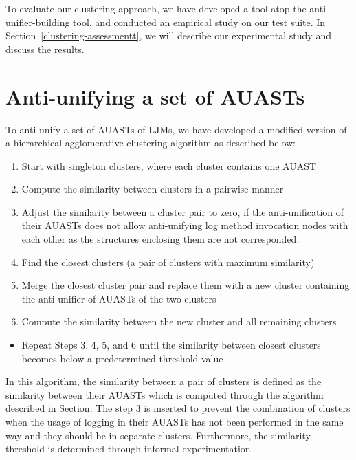 To evaluate our clustering approach, we have developed a tool atop the anti-unifier-building tool, and conducted an empirical study on our test suite. In Section~\ref{clustering-assessmentt}, we will describe our experimental study and discuss the results. 



\section{Anti-unifying a set of AUASTs} \label{meth-clustering}
To anti-unify a set of AUASTs of LJMs, we have developed a modified version of a hierarchical agglomerative clustering algorithm as described below:
\begin{enumerate} [leftmargin=.3in]
\item Start with singleton clusters, where each cluster contains one AUAST
\item Compute the similarity between clusters in a pairwise manner
\item Adjust the similarity between a cluster pair to zero, if the anti-unification of their AUASTs does not allow anti-unifying log method invocation nodes with each other as the structures enclosing them are not corresponded. 
\item Find the closest clusters (a pair of clusters with maximum  similarity)
\item Merge the closest cluster pair and replace them with a new cluster containing the anti-unifier of AUASTs of the two clusters
\item Compute the similarity between the new cluster and all remaining clusters
\end{enumerate}
\begin{itemize} [leftmargin=.3in]
\item Repeat Steps 3, 4, 5, and 6 until the similarity between closest clusters becomes below a predetermined threshold value
\end{itemize}

In this algorithm, the similarity between a pair of clusters is defined as the similarity between their AUASTs which is computed through the algorithm described in Section.
The step 3 is inserted to prevent the combination of clusters when the usage of logging in their AUASTs has not been performed in the same way and they should be in separate clusters. Furthermore, the similarity threshold is determined through informal experimentation.

